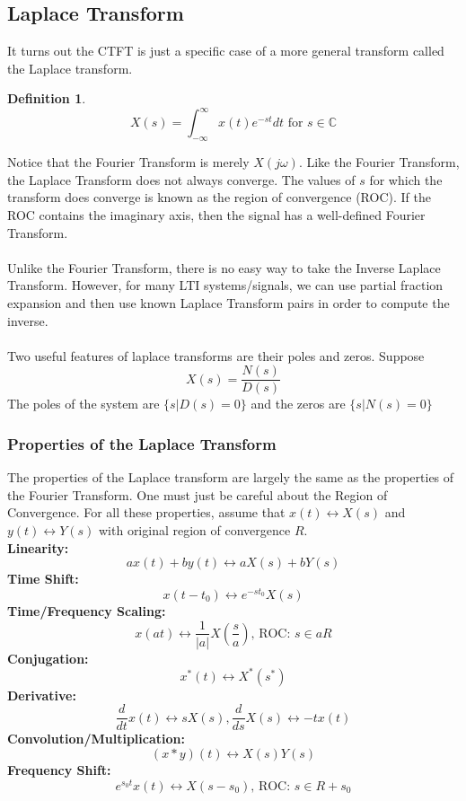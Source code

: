 \documentclass{article}
\newtheorem{definition}{Definition}
\begin{document}
\subsection{Laplace Transform}
It turns out the CTFT  is just a specific case of a more general transform called the Laplace transform.
\begin{definition}
    $$X(s) = \int_{-\infty}^{\infty}{x(t)e^{-st}dt} \text { for } s\in\mathbb{C}$$
\end{definition}
Notice that the Fourier Transform is merely $X(j\omega)$. Like the Fourier Transform, the Laplace Transform does not always converge.
The values of $s$ for which the transform does converge is known as the region of convergence (ROC). If the ROC contains the imaginary axis,
then the signal has a well-defined Fourier Transform. \\\\
Unlike the Fourier Transform, there is no easy way to take the Inverse Laplace Transform.
However, for many LTI systems/signals, we can use partial fraction expansion and then use known Laplace Transform pairs in order to compute the inverse.\\\\
Two useful features of laplace transforms are their poles and zeros. Suppose
$$X(s) = \frac{N(s)}{D(s)}$$
The poles of the system are $\{s | D(s)=0\}$ and the zeros are $\{s | N(s)=0\}$
\subsubsection{Properties of the Laplace Transform}
The properties of the Laplace transform are largely the same as the properties of the Fourier Transform. One must just be careful about the Region of Convergence.
For all these properties, assume that $x(t) \leftrightarrow X(s)$ and $y(t) \leftrightarrow Y(s)$ with original region of convergence $R$.\\
\textbf{Linearity: } 
$$ax(t) + by(t) \leftrightarrow aX(s) + bY(s)$$
\textbf{Time Shift: }
$$x(t-t_0) \leftrightarrow e^{-s t_0}X(s)$$
\textbf{Time/Frequency Scaling: }
$$x(at) \leftrightarrow \frac{1}{|a|}X(\frac{s}{a})\text{, ROC: }s\in aR$$
\textbf{Conjugation: } 
$$x^*(t) \leftrightarrow X^*(s^*)$$
\textbf{Derivative: } 
$$\frac{d}{dt}x(t) \leftrightarrow s X(s), \frac{d}{ds}X(s) \leftrightarrow -t x(t)$$
\textbf{Convolution/Multiplication: } 
$$(x*y)(t) \leftrightarrow X(s)Y(s)$$
\textbf{Frequency Shift: } 
$$e^{s_0 t}x(t) \leftrightarrow X(s - s_0)\text{, ROC: }s\in R+s_0$$
\end{document}
